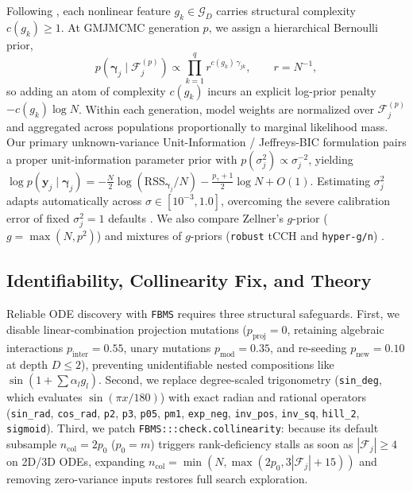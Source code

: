 \documentclass{article}
\begin{document}
Following \citet{hubin2021flexible,lachmann2025fbms}, each nonlinear feature $g_k \in \mathcal{G}_D$ carries structural complexity $c(g_k) \ge 1$. At GMJMCMC generation $p$, we assign a hierarchical Bernoulli prior,
\begin{equation}
  p(\boldsymbol{\gamma}_j \mid \mathcal{F}_j^{(p)}) \propto \prod_{k=1}^{q} r^{c(g_k)\,\gamma_{jk}}, \qquad r = N^{-1},
\end{equation}
so adding an atom of complexity $c(g_k)$ incurs an explicit log-prior penalty $-c(g_k)\log N$. Within each generation, model weights are normalized over $\mathcal{F}_j^{(p)}$ and aggregated across populations proportionally to marginal likelihood mass. Our primary unknown-variance Unit-Information / Jeffreys-BIC formulation pairs a proper unit-information parameter prior \citep{kass1995reference} with $p(\sigma_j^2) \propto \sigma_j^{-2}$, yielding $\log p(\boldsymbol{y}_j \mid \boldsymbol{\gamma}_j) = -\frac{N}{2}\log(\text{RSS}_{\boldsymbol{\gamma}_j}/N) - \frac{p_{\gamma}+1}{2}\log N + O(1)$. Estimating $\sigma_j^2$ adapts automatically across $\sigma \in [10^{-3}, 1.0]$, overcoming the severe calibration error of fixed $\sigma_j^2=1$ defaults \citep{hubin2025bgnlm}. We also compare Zellner's $g$-prior ($g=\max(N,p^2)$) \citep{zellner1986assessing} and mixtures of $g$-priors (\texttt{robust} tCCH and \texttt{hyper-g/n}) \citep{liang2008mixtures}.

\subsection{Identifiability, Collinearity Fix, and Theory}

Reliable ODE discovery with \texttt{FBMS} requires three structural safeguards. First, we disable linear-combination projection mutations ($p_{\text{proj}} = 0$, retaining algebraic interactions $p_{\text{inter}} = 0.55$, unary mutations $p_{\text{mod}} = 0.35$, and re-seeding $p_{\text{new}} = 0.10$ at depth $D \le 2$), preventing unidentifiable nested compositions like $\sin(1+\sum \alpha_l g_l)$. Second, we replace degree-scaled trigonometry (\texttt{sin\_deg}, which evaluates $\sin(\pi x/180)$) with exact radian and rational operators (\texttt{sin\_rad}, \texttt{cos\_rad}, \texttt{p2}, \texttt{p3}, \texttt{p05}, \texttt{pm1}, \texttt{exp\_neg}, \texttt{inv\_pos}, \texttt{inv\_sq}, \texttt{hill\_2}, \texttt{sigmoid}). Third, we patch \texttt{FBMS:::check.collinearity}: because its default subsample $n_{\text{col}} = 2p_0$ ($p_0 = m$) triggers rank-deficiency stalls as soon as $|\mathcal{F}_j| \ge 4$ on 2D/3D ODEs, expanding $n_{\text{col}} = \min(N, \max(2p_0, 3|\mathcal{F}_j|+15))$ and removing zero-variance inputs restores full search exploration.
\end{document}
